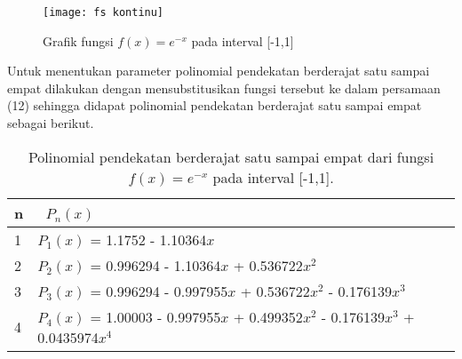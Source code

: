 \documentclass[a4paper,12pt]{article}
\begin{document}
\begin{enumerate}
	\begin{figure}[H]
		\begin{center}
			\texttt{[image: fs kontinu]}
		\end{center}
		\begin{center}
			\caption{Grafik fungsi $f(x)=e^{-x}$ pada interval [-1,1]}
		\end{center}
	\end{figure}
	Untuk menentukan parameter polinomial pendekatan berderajat satu sampai empat dilakukan dengan mensubstitusikan fungsi tersebut ke dalam persamaan (12) sehingga didapat polinomial pendekatan berderajat satu sampai empat sebagai berikut.\\
	
	\begin{table}[H]
		\caption{Polinomial pendekatan berderajat satu sampai empat dari fungsi $f(x)=e^{-x} $ pada interval [-1,1].}
		\begin{center}
    		\begin{tabular}{|p{3mm}|p{120mm}|}
			\hline
			n & \ $P_n(x)$ \\ \hline
			1 & $P_1(x)$ = 1.1752 - 1.10364$x$ \\
			2 & $P_2(x)$ = 0.996294 - 1.10364$x$ + 0.536722$x^2$ \\
			3 & $P_3(x)$ = 0.996294 - 0.997955$x$ + 0.536722$x^2$ - 0.176139$x^3$\\
			4 & $P_4(x)$ = 1.00003 - 0.997955$x$ + 0.499352$x^2$ - 0.176139$x^3$ + 0.0435974$x^4$\\
	

\end{tabular}
\end{center}
\end{table}
\end{enumerate}
\end{document}
